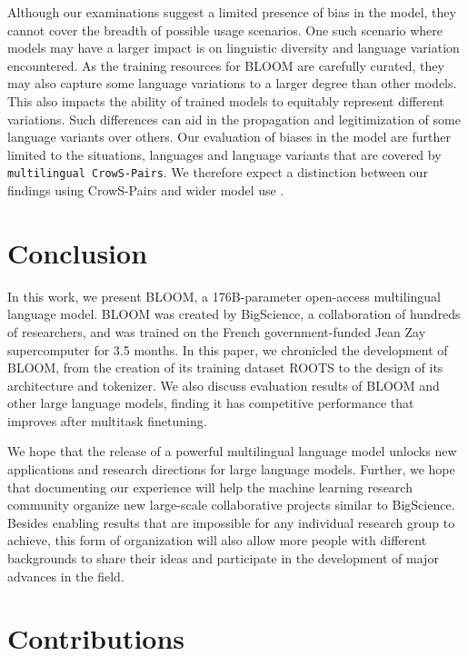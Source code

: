 \documentclass[twoside,11pt]{article}
\begin{document}
Although our examinations suggest a limited presence of bias in the model, they cannot cover the breadth of possible usage scenarios. One such scenario where models may have a larger impact is on linguistic diversity and language variation encountered.
As the training resources for BLOOM are carefully curated, they may also capture some language variations to a larger degree than other models. This also impacts the ability of trained models to equitably represent different variations. Such differences can aid in the propagation and legitimization of some language variants over others.
Our evaluation of biases in the model are further limited to the situations, languages and language variants that are covered by \texttt{multilingual CrowS-Pairs}.
We therefore expect a distinction between our findings using CrowS-Pairs and wider model use \citep[for a more detailed exploration on such differences, see][]{raji_AI_2021}.

\section{Conclusion}
In this work, we present BLOOM, a 176B-parameter open-access multilingual language model.
BLOOM was created by BigScience, a collaboration of hundreds of researchers, and was trained on the French government-funded Jean Zay supercomputer for 3.5 months.
In this paper, we chronicled the development of BLOOM, from the creation of its training dataset ROOTS to the design of its architecture and tokenizer.
We also discuss evaluation results of BLOOM and other large language models, finding it has competitive performance that improves after multitask finetuning.

We hope that the release of a powerful multilingual language model unlocks new applications and research directions for large language models.
Further, we hope that documenting our experience will help the machine learning research community organize new large-scale collaborative projects similar to BigScience. Besides enabling results that are impossible for any individual research group to achieve, this form of organization will also allow more people with different backgrounds to share their ideas and participate in the development of major advances in the field.

\section{Contributions}
\label{sec:contributions}
\end{document}
